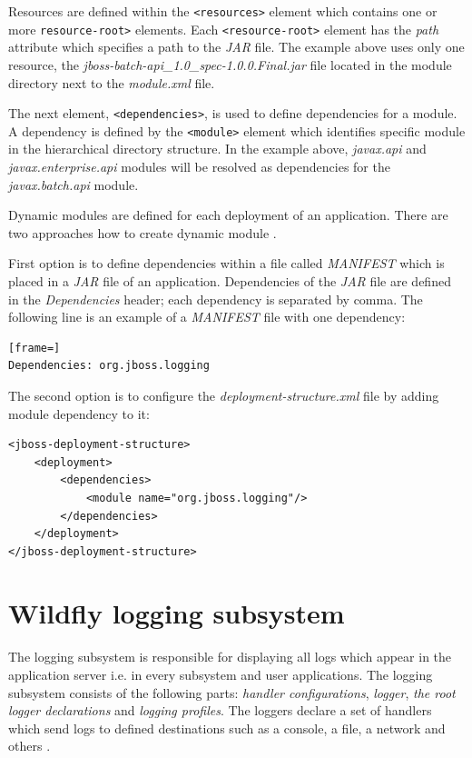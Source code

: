\documentclass[12pt,oneside]{fithesis2}
\begin{document}
Resources are defined within the \verb|<resources>| element which contains one or more \verb|resource-root>| elements. Each \verb|<resource-root>| element has the \textit{path} attribute which specifies a path to the \textit{JAR} file. The example above uses only one resource, the \textit{jboss-batch-api\_1.0\_spec-1.0.0.Final.jar} file located in the module directory next to the \textit{module.xml} file.

The next element, \verb|<dependencies>|, is used to define dependencies for a module. A dependency is defined by the \verb|<module>| element which identifies specific module in the hierarchical directory structure. In the example above, \textit{javax.api} and \textit{javax.enterprise.api} modules will be resolved as dependencies for the \textit{javax.batch.api} module.

Dynamic modules are defined for each deployment of an application. There are two approaches how to create dynamic module \cite{wildfly_book}.

First option is to define dependencies within a file called \textit{MANIFEST} which is placed in a \textit{JAR} file of an application. Dependencies of the \textit{JAR} file are defined in the \textit{Dependencies} header; each dependency is separated by comma. The following line is an example of a \textit{MANIFEST} file with one dependency:

\begin{lstlisting}[frame=]
Dependencies: org.jboss.logging
\end{lstlisting}

\newpage
The second option is to configure the \textit{deployment-structure.xml} file by adding module dependency to it:

\begin{lstlisting}[caption = Configuring the deployment structure file \cite{wildfly_book}, label = dynamic_module_descriptor, style=my_xml]
<jboss-deployment-structure>
	<deployment>
		<dependencies>
			<module name="org.jboss.logging"/>
		</dependencies>
	</deployment>
</jboss-deployment-structure>
\end{lstlisting}

\section{Wildfly logging subsystem}
\label{wildfly_logging}
The logging subsystem is responsible for displaying all logs which appear in the application server i.e. in every subsystem and user applications. The logging subsystem consists of the following parts: \textit{handler configurations}, \textit{logger}, \textit{the root logger declarations} and \textit{logging profiles}. The loggers declare a set of handlers which send logs to defined destinations such as a console, a file, a network and others \cite[Logging Configuration]{wildfly_doc}.
\end{document}
